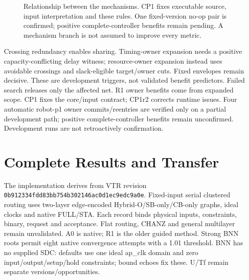 \documentclass[conference,10pt]{IEEEtran}
\begin{document}
\begin{figure}[t]
\centering\footnotesize
{}
\caption{Relationship between the mechanisms. CP1 fixes executable source, input interpretation and these rules. One fixed-version no-op pair is confirmed; positive complete-controller benefits remain pending. A mechanism branch is not assumed to improve every metric.}
\label{fig:method}
\end{figure}

Crossing redundancy enables sharing. Timing-owner expansion needs a positive capacity-conflicting delay witness; resource-owner expansion instead uses avoidable crossings and slack-eligible target/owner cuts. Fixed envelopes remain decisive. These are development triggers, not validated benefit predictors. Failed search releases only the affected net. R1 owner benefits come from expanded scope. CP1 fixes the core/input contract; CP1r2 corrects runtime issues. Four automatic robot-p1 owner commits/reentries are verified only on a partial development path; positive complete-controller benefits remain unconfirmed. Development runs are not retroactively confirmation.
\section{Complete Results and Transfer}
The implementation derives from VTR revision \texttt{0b912334fdd83bb754b302146ac0d1ec9edc9a0e}. Fixed-input serial clustered routing uses two-layer edge-encoded Hybrid-O/SB-only/CB-only graphs, ideal clocks and native FULL/STA. Each record binds physical inputs, constraints, binary, request and acceptance. Flat routing, CHANZ and general multilayer remain unvalidated. A0 is native; R1 is the older guided method. Strong BNN roots permit eight native convergence attempts with a 1.01 threshold. BNN has no supplied SDC: defaults use one ideal ap\_clk domain and zero input/output/setup/hold constraints; bound echoes fix these. U/Tf remain separate versions/opportunities.
\end{document}
